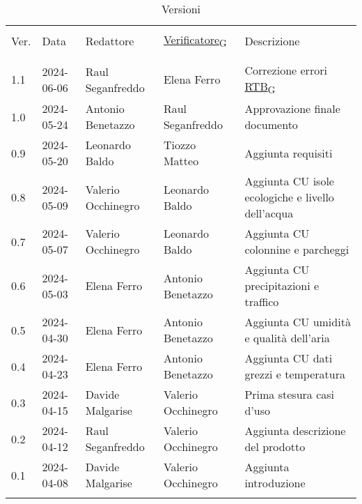 \documentclass[12pt]{article}
\begin{document}


\newpage



\captionsetup[table]{list=no}
\begin{table}[!h]
	\footnotesize
	\begin{center}
		\caption*{Versioni}
		\vspace{0.5cm}
		\begin{tabular}{ l l l l p{6.1cm} }
			\hline                                                                                                          \\[-2ex]
			Ver. & Data & Redattore & \href{https://7last.github.io/docs/pb/documentazione-interna/glossario\#verificatore}{Verificatore\textsubscript{G}} & Descrizione\\
			\\[-2ex] \hline \\[-1.5ex]
            1.1 & 2024-06-06  & Raul Seganfreddo & Elena Ferro & Correzione errori \href{https://7last.github.io/docs/pb/documentazione-interna/glossario\#requirements-and-technology-baseline}{RTB\textsubscript{G}}\\
			1.0 & 2024-05-24 & Antonio Benetazzo & Raul Seganfreddo & Approvazione finale documento\\
			0.9 & 2024-05-20 & Leonardo Baldo & Tiozzo Matteo & Aggiunta requisiti\\
			0.8 & 2024-05-09 & Valerio Occhinegro & Leonardo Baldo & Aggiunta CU isole ecologiche e livello dell'acqua \\
			0.7 & 2024-05-07 & Valerio Occhinegro & Leonardo Baldo & Aggiunta CU colonnine e parcheggi\\
			0.6 & 2024-05-03 & Elena Ferro & Antonio Benetazzo & Aggiunta CU precipitazioni e traffico\\
			0.5 & 2024-04-30 & Elena Ferro & Antonio Benetazzo & Aggiunta CU umidità e qualità dell'aria\\
			0.4 & 2024-04-23 & Elena Ferro & Antonio Benetazzo & Aggiunta CU dati grezzi e temperatura\\
			0.3 & 2024-04-15 & Davide Malgarise & Valerio Occhinegro & Prima stesura casi d'uso\\
			0.2 & 2024-04-12 & Raul Seganfreddo & Valerio Occhinegro & Aggiunta descrizione del prodotto \\
			0.1 & 2024-04-08 & Davide Malgarise & Valerio Occhinegro & Aggiunta introduzione \\
			\\[-1.5ex] \hline
		\end{tabular}
	\end{center}
\end{table}
\captionsetup[table]{list=yes}

\newpage

\tableofcontents
\listoftables
\listoffigures

\newpage



\newpage



\newpage



\newpage


\end{document}
